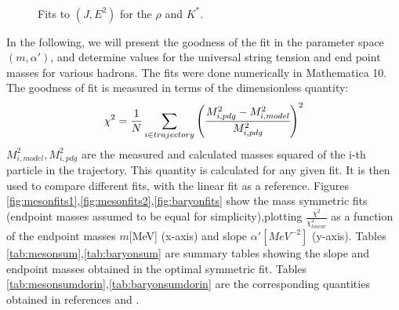 \documentclass[11pt,a4paper]{article}
\begin{document}
\begin{figure}[h]
\centering
	~
	\caption{Fits to $\left(J,E^{2}\right)$ for the $\rho$ and $K^{*}$.}
	\label{fig:jfit}  
\end{figure}
 
In the following, we will present the goodness of the fit in the parameter space $\left(m,\alpha'\right)$, and determine values for the universal string tension and end point masses for various hadrons. The fits were done numerically in Mathematica 10. The goodness of fit is measured in terms of the dimensionless quantity:
\begin{equation}
\label{eq:chisq}
\chi^{2}=\frac{1}{N}\sum_{i\in trajectory}\left(\cfrac{M_{i,pdg}^{2}-M_{i,model}^{2}}{M_{i,pdg}^{2}}\right)^{2}
\end{equation}
$M_{i,model}^{2},M_{i,pdg}^{2}$ are the measured and calculated masses squared of the i-th particle in the trajectory. This quantity is calculated for any given fit. It is then used to compare different fits, with the linear fit as a reference. Figures \ref{fig:mesonfits1},\ref{fig:mesonfits2},\ref{fig:baryonfits} show the mass symmetric fits (endpoint masses assumed to be equal for simplicity),plotting $\frac{\chi^{2}}{\chi_{linear}^{2}}$ as a function of the endpoint masses $m$[MeV] (x-axis) and slope $\alpha'[MeV^{-2}]$ (y-axis). Tables \ref{tab:mesonsum},\ref{tab:baryonsum} are summary tables showing the slope and endpoint masses obtained in the optimal symmetric fit. Tables \ref{tab:mesonsumdorin},\ref{tab:baryonsumdorin} are the corresponding quantities obtained in references \cite{Sonnenschein14} and \cite{Sonnenschein15}.
\end{document}
